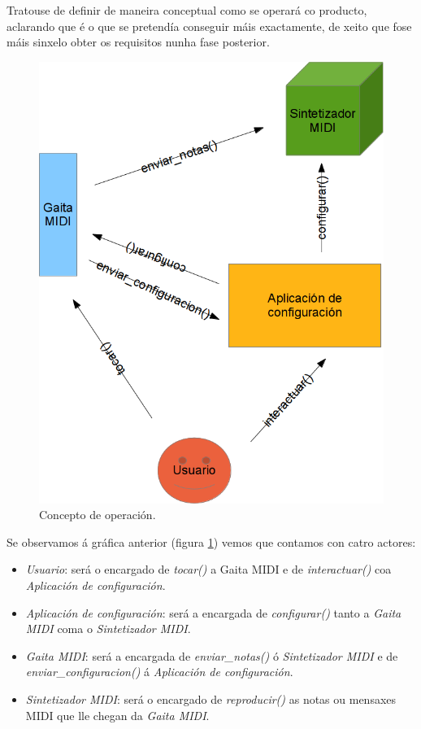  Tratouse de definir de maneira conceptual como se operará co producto,
 aclarando que é o que se pretendía conseguir máis exactamente, de xeito que
 fose máis sinxelo obter os requisitos nunha fase posterior. \\

 \begin{figure}[htbp]
  \centering
  \includegraphics[scale=0.6,keepaspectratio=true]{./imagenes/concepto-operacion.png}
  \caption{Concepto de operación.}
  \label{figura:ConceptoOperacion}
 \end{figure}

 Se observamos á gráfica anterior (figura \ref{figura:ConceptoOperacion}) vemos
 que contamos con catro actores:

 \begin{itemize}
  \item \textit{Usuario}: será o encargado de \textit{tocar()} a Gaita MIDI e
        de \textit{interactuar()} coa \textit{Aplicación de configuración}.
  \item \textit{Aplicación de configuración}: será a encargada de
        \textit{configurar()} tanto a \textit{Gaita MIDI} coma o
        \textit{Sintetizador MIDI}.
  \item \textit{Gaita MIDI}: será a encargada de \textit{enviar\_notas()} ó
        \textit{Sintetizador MIDI} e de \textit{enviar\_configuracion()} á
        \textit{Aplicación de configuración}.
  \item \textit{Sintetizador MIDI}: será o encargado de \textit{reproducir()} as
        notas ou mensaxes MIDI que lle chegan da \textit{Gaita MIDI}.
 \end{itemize}

